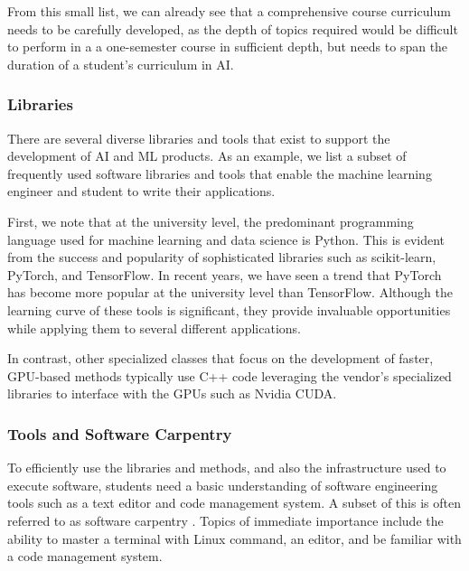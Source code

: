 \documentclass[utf8]{FrontiersinVancouver} %
\begin{document}
From this small list, we can already see that a comprehensive course curriculum needs to be carefully developed, as the depth of topics required would be difficult to perform in a a one-semester course in sufficient depth, but needs to span the duration of a student's curriculum in AI.

\subsubsection{Libraries}

There are several diverse libraries and tools that exist to support the development of AI and ML products.  As an example, we list a subset of frequently used software libraries and tools that enable the machine learning engineer and student to write their applications.

First, we note that at the university level, the predominant programming language used for machine learning and data science is Python. This is evident from the success and popularity of sophisticated libraries such as scikit-learn, PyTorch, and TensorFlow. In recent years, we have seen a trend that PyTorch has become more popular at the university level than TensorFlow.  Although the learning curve of these tools is significant, they provide invaluable opportunities while applying them to several different applications.

In contrast, other specialized classes that focus on the development of faster, GPU-based methods typically use C++ code leveraging the vendor's specialized libraries to interface with the GPUs such as Nvidia CUDA.

\subsubsection{Tools and Software Carpentry}\label{sec:tools}


To efficiently use the libraries and methods, and also the infrastructure used to execute software, students need a basic understanding of software engineering tools such as a text editor and code management system.  A subset of this is often referred to as software carpentry \cite{software-carpentry}. Topics of immediate importance include the ability to master a terminal with Linux command, an editor, and be familiar with a code management system.
\end{document}

